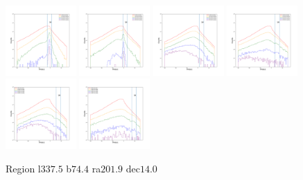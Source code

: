 \documentclass[12pt,prd]{article}
\begin{document}
\begin{figure}[h!]
\includegraphics[width=0.24\textwidth]{../figures/scanning_plotsgaiascan_l337_5_b74_4_ra201_9_dec14_0_npy_12.pdf}
\includegraphics[width=0.24\textwidth]{../figures/scanning_plotsgaiascan_l337_5_b74_4_ra201_9_dec14_0_npy_13.pdf}
\includegraphics[width=0.24\textwidth]{../figures/scanning_plotsgaiascan_l337_5_b74_4_ra201_9_dec14_0_npy_14.pdf}
\includegraphics[width=0.24\textwidth]{../figures/scanning_plotsgaiascan_l337_5_b74_4_ra201_9_dec14_0_npy_15.pdf}
\includegraphics[width=0.24\textwidth]{../figures/scanning_plotsgaiascan_l337_5_b74_4_ra201_9_dec14_0_npy_16.pdf}
\includegraphics[width=0.24\textwidth]{../figures/scanning_plotsgaiascan_l337_5_b74_4_ra201_9_dec14_0_npy_17.pdf}
\caption{Region l$337.5$ b$74.4$ ra$201.9$ dec$14.0$}
\end{figure}
\end{document}
